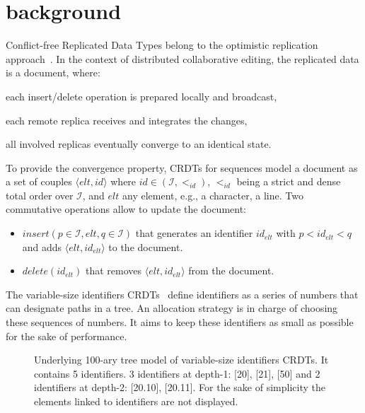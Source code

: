 
\section{background}
\label{sec:background}

Conflict-free Replicated Data Types belong to the optimistic
replication approach~\cite{saito2002replication,saito2005optimistic}. In the
context of distributed collaborative editing, the replicated data is a
document, where:
\begin{inparaenum}[(1)]
\item each insert/delete operation is prepared locally and broadcast,
\item each remote replica receives and integrates the changes,
\item all involved replicas eventually converge to an identical state.
\end{inparaenum}

To provide the convergence property, CRDTs for sequences model a document as a
set of couples $\langle elt, id\rangle$ where $id \in (\mathcal{I}, <_{id})$,
$<_{id}$ being a strict and dense total order over $\mathcal{I}$, and $elt$ any
element, e.g., a character, a line. Two commutative operations allow to
update the document:
\begin{itemize}
\item $insert(p \in \mathcal{I}, elt, q \in \mathcal{I})$ that generates an
  identifier $id_{elt}$ with $p<id_{elt}<q$ and adds $\langle elt, id_{elt}
  \rangle$ to the document.
\item $delete(id_{elt})$ that removes $\langle elt, id_{elt}\rangle$ from the
  document.
\end{itemize} 

The variable-size identifiers
CRDTs~\cite{preguica2009commutative,weiss2009logoot} define identifiers as a
series of numbers that can designate paths in a tree. An allocation strategy is
in charge of choosing these sequences of numbers. It aims to keep these
identifiers as small as possible for the sake of performance.

\begin{figure}[h]
\begin{center}

\end{center}
\caption{Underlying 100-ary tree model of variable-size identifiers CRDTs. It
  contains 5 identifiers. 3 identifiers at depth-1: [20], [21], [50] and 2
  identifiers at depth-2: [20.10], [20.11]. For the sake of simplicity the
  elements linked to identifiers are not displayed.}
\label{fig:treeexample}
\end{figure}

